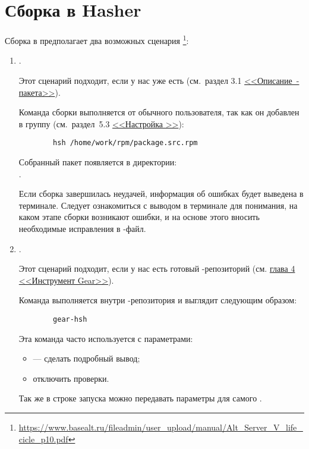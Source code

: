 \section{Сборка в Hasher}
Сборка в  предполагает два возможных сценария%
\footnote{\href{https://www.basealt.ru/fileadmin/user_upload/manual/Alt_Server_V_life_cicle_p10.pdf}{https://www.basealt.ru/fileadmin/user\_upload/manual/Alt\_Server\_V\_life\_cicle\_p10.pdf}}: 
\begin{enumerate}
	\item {}.
	
		Этот сценарий подходит, если у нас уже есть  (см.~раздел 3.1 \hyperlink{3.1}{\mbox{<<Описание -пакета>>}}).
	
	Команда сборки выполняется от обычного пользователя, так как он добавлен в группу  
		(см.~раздел~5.3 \hyperlink{5.3}{<<Настройка >>}): 
	\begin{verbatim}
		hsh /home/work/rpm/package.src.rpm
	\end{verbatim}
	Собранный пакет появляется в директории:\\ . 
	
	Если сборка завершилась неудачей, информация об ошибках будет выведена в терминале. Следует ознакомиться 
		с выводом в терминале для понимания, на каком этапе сборки возникают ошибки, и на основе этого 
		вносить необходимые исправления в -файл.
	
	\item  {}.
	
	Этот сценарий подходит, если у нас есть готовый -репозиторий (см. \hyperlink{4}{глава 4 <<Инструмент Gear>>}).
	
	 Команда выполняется внутри -репозитория и выглядит следующим образом:
	 \begin{verbatim}
	 	gear-hsh
	 \end{verbatim}
	 
	 Эта команда часто используется с параметрами: 
	 \begin{itemize}
	 	\item {} --- сделать подробный вывод;
	 	\item {} отключить проверки.
	 \end{itemize}
	 Так же в строке запуска  можно передавать параметры для самого . 
\end{enumerate}

